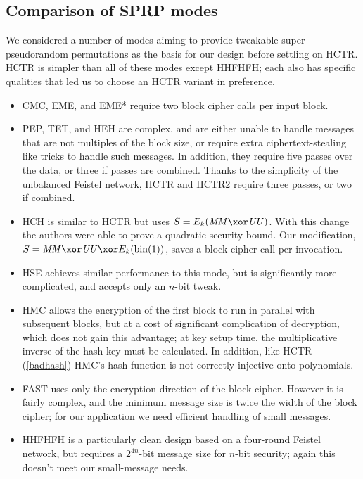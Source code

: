 \documentclass[hctr2.tex]{subfiles}
\begin{document}
\subsection{Comparison of SPRP modes}
We considered a number of modes aiming to provide
tweakable super-pseudorandom permutations
as the basis for our design before settling on HCTR\@.
HCTR is simpler than all of these modes except HHFHFH;
each also has specific qualities that led us to choose
an HCTR variant in preference.
\begin{itemize}
    \item CMC\cite{cmc}, EME\cite{eme}, and EME*\cite{emestar}
    require two block cipher calls per input block.
    \item PEP\cite{pep}, TET\cite{tet}, and HEH\cite{heh} are 
    complex, and are either
    unable to handle messages that are not multiples of the
    block size, or require extra ciphertext-stealing like tricks
    to handle such messages.
    In addition, they require five passes over the data,
    or three if passes are combined.
    Thanks to the simplicity of the unbalanced Feistel network,
    HCTR and HCTR2 require three passes, or two if combined.
    \item HCH\cite{hch} is similar to HCTR
    but uses \(S = E_k(\MM \xor \UU)\).
    With this change the authors were able to prove a
    quadratic security bound. Our modification,
    \(S = \MM \xor \UU \xor E_k(\fromint(1))\), saves
    a block cipher call per invocation.
    \item HSE\cite{hse} achieves similar performance to
    this mode, but is significantly more complicated,
    and accepts only an \(n\)-bit tweak.
    \item HMC\cite{hmc} allows the encryption of the
    first block to run in parallel with subsequent blocks,
    but at a cost of significant complication of decryption,
    which does not gain this advantage;
    at key setup time, the multiplicative inverse of
    the hash key must be calculated.
    In addition, like HCTR (\autoref{badhash}) HMC's hash
    function is not correctly injective onto polynomials.
    \item FAST\cite{fast} uses only the encryption
    direction of the block cipher. However 
    it is fairly complex, and the minimum
    message size is twice the width of the block cipher;
    for our application we need efficient handling of small messages.
    \item HHFHFH\cite{hufflehuff} is a particularly
    clean design based on a four-round Feistel network,
    but requires a \(2^{4n}\)-bit message size for
    \(n\)-bit security; again this doesn't meet our
    small-message needs.
\end{itemize}
\end{document}

